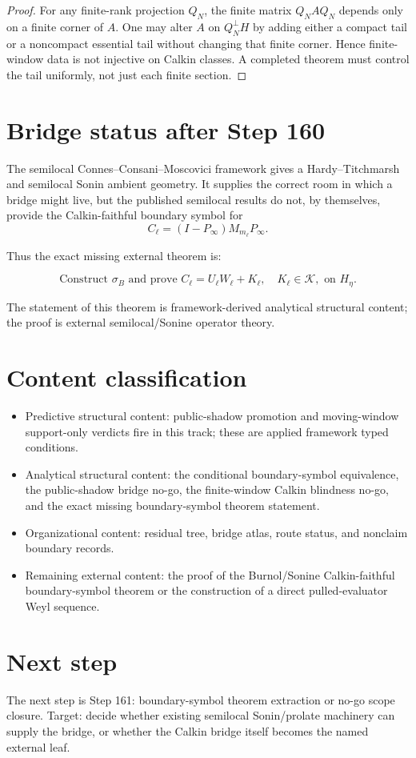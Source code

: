 \documentclass[11pt]{article}
\begin{document}
\begin{proof}
For any finite-rank projection \(Q_N\), the finite matrix
\(Q_N A Q_N\) depends only on a finite corner of \(A\).  One may alter \(A\) on
\(Q_N^\perp H\) by adding either a compact tail or a noncompact essential tail
without changing that finite corner.  Hence finite-window data is not injective on
Calkin classes.  A completed theorem must control the tail uniformly, not just
each finite section.
\end{proof}

\section{Bridge status after Step 160}

The semilocal Connes--Consani--Moscovici framework gives a Hardy--Titchmarsh
and semilocal Sonin ambient geometry.  It supplies the correct room in which a
bridge might live, but the published semilocal results do not, by themselves,
provide the Calkin-faithful boundary symbol for
\[
C_\ell=(I-P_\infty)M_{m_\ell}P_\infty.
\]

Thus the exact missing external theorem is:

\[
\boxed{
\text{Construct }\sigma_B\text{ and prove }
C_\ell=U_\ell W_\ell+K_\ell,\quad K_\ell\in\mathcal K,
\text{ on }H_\eta.
}
\]

The statement of this theorem is framework-derived analytical structural content;
the proof is external semilocal/Sonine operator theory.

\section{Content classification}

\begin{itemize}
\item Predictive structural content: public-shadow promotion and moving-window
support-only verdicts fire in this track; these are applied framework typed
conditions.
\item Analytical structural content: the conditional boundary-symbol equivalence,
the public-shadow bridge no-go, the finite-window Calkin blindness no-go, and
the exact missing boundary-symbol theorem statement.
\item Organizational content: residual tree, bridge atlas, route status, and
nonclaim boundary records.
\item Remaining external content: the proof of the Burnol/Sonine Calkin-faithful
boundary-symbol theorem or the construction of a direct pulled-evaluator Weyl
sequence.
\end{itemize}

\section{Next step}

The next step is Step 161: boundary-symbol theorem extraction or no-go scope
closure.  Target: decide whether existing semilocal Sonin/prolate machinery can
supply the bridge, or whether the Calkin bridge itself becomes the named external
leaf.
\end{document}
